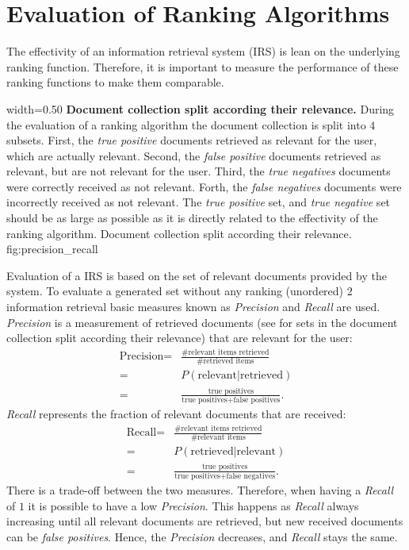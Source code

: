 \section{Evaluation of Ranking Algorithms}
\label{sec:evaluation_of_ranking_algorithms}

The effectivity of an information retrieval system (IRS) is lean on the underlying ranking function. Therefore, it is important to measure the performance of these ranking functions to make them comparable.

      {width=0.50\textwidth}
      {\textbf{Document collection split according their relevance.} During the evaluation of a ranking algorithm the document collection is split into $4$ subsets. First, the \textit{true positive} documents retrieved as relevant for the user, which are actually relevant. Second, the \textit{false positive} documents retrieved as relevant, but are not relevant for the user. Third, the \textit{true negatives} documents were correctly received as not relevant. Forth, the \textit{false negatives} documents were incorrectly received as not relevant. The \textit{true positive} set, and \textit{true negative} set should be as large as possible as it is directly related to the effectivity of the ranking algorithm.}
      {Document collection split according their relevance.}
      {fig:precision_recall}

Evaluation of a IRS is based on the set of relevant documents provided by the system. To evaluate a generated set without any ranking (unordered) $2$ information retrieval basic measures known as \textit{Precision} and \textit{Recall} are used. \textit{Precision} is a measurement of retrieved documents (see  for sets in the document collection split according their relevance) that are relevant for the user:
\begin{align}
  \label{precision}
  \text{Precision} = & \frac{\text{\# relevant items retrieved}}{\text{\# retrieved items}} \nonumber \\
    = & P(\text{relevant} | \text{retrieved}) \nonumber \\
    = & \frac{\text{true positives}}{\text{true positives} + \text{false positives}}.
\end{align}
\textit{Recall} represents the fraction of relevant documents that are received:
\begin{align}
  \text{Recall} = & \frac{\text{\# relevant items retrieved}}{\text{\# relevant items}} \nonumber \\
    = & P(\text{retrieved} | \text{relevant}) \nonumber \\
    = & \frac{\text{true positives}}{\text{true positives} + \text{false negatives}}.
\end{align}
There is a trade-off between the two measures. Therefore, when having a \textit{Recall} of $1$ it is possible to have a low \textit{Precision}. This happens as \textit{Recall} always increasing until all relevant documents are retrieved, but new received documents can be \textit{false positives}. Hence, the \textit{Precision} decreases, and \textit{Recall} stays the same.

